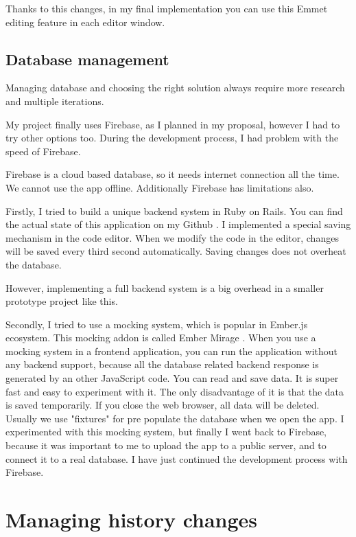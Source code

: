 \documentclass[12pt, a4paper, oneside, openright, medskipamount]{report}
\begin{document}
Thanks to this changes, in my final implementation you can use this Emmet editing feature in each editor window.

\subsection{Database management}

Managing database and choosing the right solution always require more research and multiple iterations.

My project finally uses Firebase, as I planned in my proposal, however I had to try other options too. During the development process, I had problem with the speed of Firebase.

Firebase is a cloud based database, so it needs internet connection all the time. We cannot use the app offline. Additionally Firebase has limitations also.

Firstly, I tried to build a unique backend system in Ruby on Rails. You can find the actual state of this application on my Github \cite{tutorial-builder-backend}. I implemented a special saving mechanism in the code editor. When we modify the code in the editor, changes will be saved every third second automatically. Saving changes does not overheat the database.

However, implementing a full backend system is a big overhead in a smaller prototype project like this.

Secondly, I tried to use a mocking system, which is popular in Ember.js ecosystem. This mocking addon is called Ember Mirage \cite{ember-mirage}. When you use a mocking system in a frontend application, you can run the application without any backend support, because all the database related backend response is generated by an other JavaScript code. You can read and save data. It is super fast and easy to experiment with it. The only disadvantage of it is that the data is saved temporarily. If you close the web browser, all data will be deleted. Usually we use "fixtures" for pre populate the database when we open the app. I experimented with this mocking system, but finally I went back to Firebase, because it was important to me to upload the app to a public server, and to connect it to a real database. I have just continued the development process with Firebase.

\section{Managing history changes} \label{history}
\end{document}
